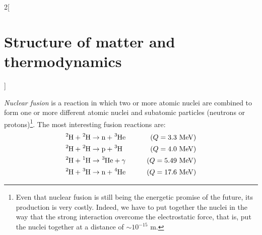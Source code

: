 \documentclass[../../../main.tex]{subfiles}
\begin{document}
\begin{multicols}{2}[\section{Structure of matter and thermodynamics}]
\begin{definition}
\begin{enumerate}
\begin{center}
\begin{minipage}{\linewidth}
              \end{minipage}
            \end{center}
    \end{enumerate}
  \end{definition}
  \begin{definition}
    \emph{Nuclear fusion} is a reaction in which two or more atomic nuclei are combined to form one or more different atomic nuclei and subatomic particles (neutrons or protons)\footnote{Even that nuclear fusion is still being the energetic promise of the future, its production is very costly. Indeed, we have to put together the nuclei in the way that the strong interaction overcome the electrostatic force, that is, put the nuclei together at a distance of $\sim 10^{-15}\text{ m}$.}. The most interesting fusion reactions are:
    \begin{align*}
      \ce{^2H}+\ce{^2H} & \rightarrow\text{n}+\ce{^3He}\qquad & (Q=3.3\text{ MeV})  \\
      \ce{^2H}+\ce{^2H} & \rightarrow\text{p}+\ce{^3H}\qquad  & (Q=4.0\text{ MeV})  \\
      \ce{^2H}+\ce{^1H} & \rightarrow\ce{^3He}+\gamma\qquad   & (Q=5.49\text{ MeV}) \\
      \ce{^2H}+\ce{^3H} & \rightarrow\text{n}+\ce{^4He}\qquad & (Q=17.6\text{ MeV})
    \end{align*}
  \end{definition}

\end{multicols}
\end{document}
